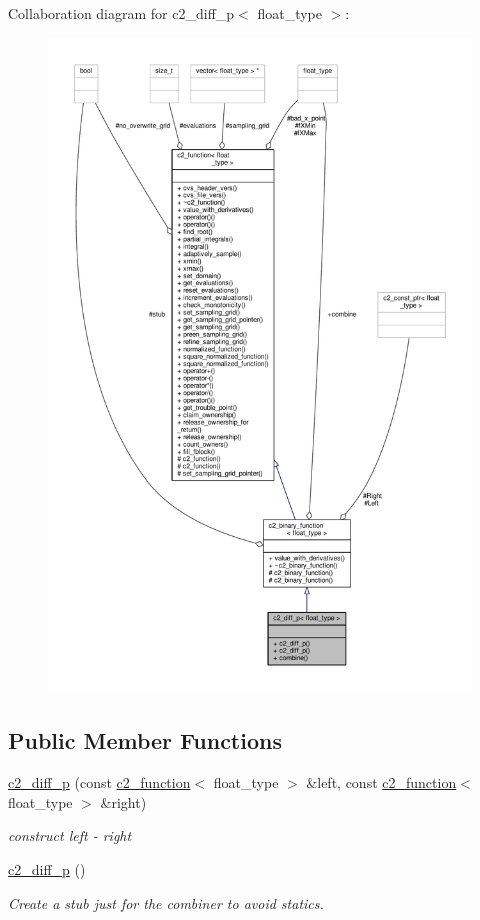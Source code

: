 Collaboration diagram for c2\+\_\+diff\+\_\+p$<$ float\+\_\+type $>$\+:
\nopagebreak
\begin{figure}[H]
\begin{center}
\leavevmode
\includegraphics[width=350pt]{classc2__diff__p__coll__graph}
\end{center}
\end{figure}
\subsection*{Public Member Functions}
\begin{DoxyCompactItemize}
\item 
\hyperlink{classc2__diff__p_adcfb42900f8d8712e055171056688818}{c2\+\_\+diff\+\_\+p} (const \hyperlink{classc2__function}{c2\+\_\+function}$<$ float\+\_\+type $>$ \&left, const \hyperlink{classc2__function}{c2\+\_\+function}$<$ float\+\_\+type $>$ \&right)
\begin{DoxyCompactList}\small\item\em construct {\itshape left} -\/ {\itshape right} \end{DoxyCompactList}\item 
\hyperlink{classc2__diff__p_a8e3593f3c2bcdceb79f57461e099db08}{c2\+\_\+diff\+\_\+p} ()
\begin{DoxyCompactList}\small\item\em Create a stub just for the combiner to avoid statics. \end{DoxyCompactList}\end{DoxyCompactItemize}
